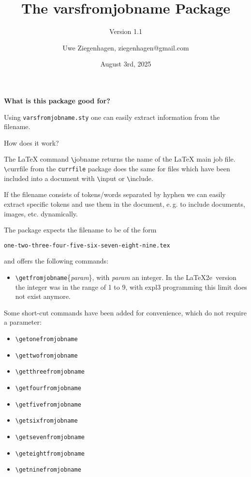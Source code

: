 ﻿\documentclass[12pt]{scrartcl}
\date{August 3rd, 2025 }
\author{Uwe Ziegenhagen, ziegenhagen@gmail.com}
\title{The varsfromjobname Package}
\subtitle{Version 1.1}
\begin{document}
\maketitle



\textbf{What is this package good for?}

\noindent Using \texttt{varsfromjobname.sty} one can easily extract information from the filename.

How does it work?

The LaTeX command \verb|\|jobname returns the name of the LaTeX main job file.  \verb|\|currfile from the \texttt{currfile} package does the same for files which have been included into a document with \verb|\|input or \verb|\|include.

If the filename consists of tokens/words separated by hyphen we can easily extract specific tokens and use them in the document, e.\,g. to include documents, images, etc. dynamically.

The package expects the filename to be of the form 

\noindent\texttt{one-two-three-four-five-six-seven-eight-nine.tex} 

\noindent and offers the following commands:

\begin{itemize}
	\item \verb|\getfromjobname|\{\textit{param}\}, with \textit{param} an integer. In the \LaTeX2e\ version the integer was in the range of 1 to 9, with expl3 programming this limit does not exist anymore.

\end{itemize}

Some short-cut commands have been added for convenience, which do not require a parameter:

\begin{itemize}
	\item \verb|\getonefromjobname|
	\item \verb|\gettwofromjobname|
	\item \verb|\getthreefromjobname|
	\item \verb|\getfourfromjobname|
	\item \verb|\getfivefromjobname|
	\item \verb|\getsixfromjobname|
	\item \verb|\getsevenfromjobname|
	\item \verb|\geteightfromjobname|
	\item \verb|\getninefromjobname|	
\end{itemize}
\end{document}
